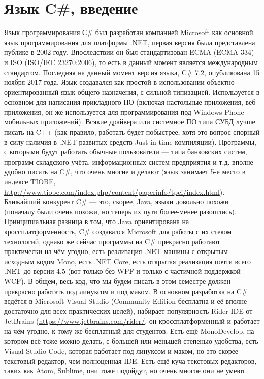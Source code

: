 \documentclass[a5paper]{article}
\begin{document}
\section{Язык C\#, введение}

Язык программирования С\# был разработан компанией Microsoft как основной язык программирования для платформы .NET, первая версия была представлена публике в 2002 году. Впоследствии он был стандартизован ECMA (ECMA-334) и ISO (ISO/IEC 23270:2006), то есть в данный момент является международным стандартом. Последняя на данный момент версия языка, C\# 7.2, опубликована 15 ноября 2017 года. Язык создавался как простой в использовании объектно-ориентированный язык общего назначения, с сильной типизацией. Используется в основном для написания прикладного ПО (включая настольные приложения, веб-приложения, он же используется для программирования под Windows Phone мобильных приложений). Всякие драйвера или системное ПО типа СУБД лучше писать на C++ (как правило, работать будет побыстрее, хотя это вопрос спорный в силу наличия в .NET развитых средств Just-in-time-компиляции). Программы, с которыми будут работать обычные пользователи --- типа банковских систем, программ складского учёта, информационных систем предприятия и т.д. вполне удобно писать на C\#, что очень многие и делают (язык занимает 5-е место в индексе TIOBE, \url{http://www.tiobe.com/index.php/content/paperinfo/tpci/index.html}). Ближайший конкурент C\# --- это, скорее, Java, языки довольно похожи (поначалу были очень похожи, но теперь их пути более-менее разошлись). Принципиальная разница в том, что Java ориентирована на кроссплатформенность, C\# создавался Microsoft для работы с их стеком технологий, однако же сейчас программы на C\# прекрасно работают практически на чём угодно, есть реализация .NET-машины с открытым исходным кодом Mono, есть .NET Core, есть открытая реализация почти всего .NET до версии 4.5 (вот только без WPF и только с частичной поддержкой WCF). В общем, весь код, что мы будем писать в этом семестре должен прекрасно работать под линуксом и под маком. В основном разработка на C\# ведётся в Microsoft Visual Studio (Community Edition бесплатна и её вполне достаточно для всех практических целей), набирает популярность Rider IDE от JetBrains (\url{https://www.jetbrains.com/rider/}, он кроссплатформенный и работает на чём угодно, к тому же бесплатный для студентов. Есть ещё MonoDevelop, на котором всё тоже можно делать, с большей или меньшей степенью удобства, есть Visual Studio Code, которая работает под линуксом и маком, но это скорее текстовый редактор, чем полноценная IDE. Есть ещё куча текстовых редакторов, таких как Atom, Sublime, они тоже подойдут, но очень многое они не умеют.
\end{document}
